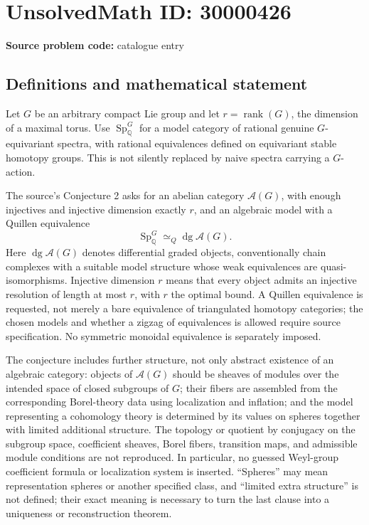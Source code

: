 \documentclass[11pt]{article}
\newcommand{\Q}{\mathbb{Q}}
\begin{document}
\section*{UnsolvedMath ID: 30000426}
\textbf{Source problem code:} catalogue entry
\subsection{Definitions and mathematical statement}
Let \(G\) be an arbitrary compact Lie group and let \(r=\operatorname{rank}(G)\), the dimension of a maximal torus. Use \(\operatorname{Sp}^G_{\Q}\) for a model category of rational genuine \(G\)-equivariant spectra, with rational equivalences defined on equivariant stable homotopy groups. This is not silently replaced by naive spectra carrying a \(G\)-action.

The source's Conjecture 2 asks for an abelian category \(\mathcal A(G)\), with enough injectives and injective dimension exactly \(r\), and an algebraic model with a Quillen equivalence
\[
\operatorname{Sp}^G_{\Q}\simeq_Q\operatorname{dg}\mathcal A(G).
\]
Here \(\operatorname{dg}\mathcal A(G)\) denotes differential graded objects, conventionally chain complexes with a suitable model structure whose weak equivalences are quasi-isomorphisms. Injective dimension \(r\) means that every object admits an injective resolution of length at most \(r\), with \(r\) the optimal bound. A Quillen equivalence is requested, not merely a bare equivalence of triangulated homotopy categories; the chosen models and whether a zigzag of equivalences is allowed require source specification. No symmetric monoidal equivalence is separately imposed.

The conjecture includes further structure, not only abstract existence of an algebraic category: objects of \(\mathcal A(G)\) should be sheaves of modules over the intended space of closed subgroups of \(G\); their fibers are assembled from the corresponding Borel-theory data using localization and inflation; and the model representing a cohomology theory is determined by its values on spheres together with limited additional structure. The topology or quotient by conjugacy on the subgroup space, coefficient sheaves, Borel fibers, transition maps, and admissible module conditions are not reproduced. In particular, no guessed Weyl-group coefficient formula or localization system is inserted. ``Spheres'' may mean representation spheres or another specified class, and ``limited extra structure'' is not defined; their exact meaning is necessary to turn the last clause into a uniqueness or reconstruction theorem.
\end{document}
